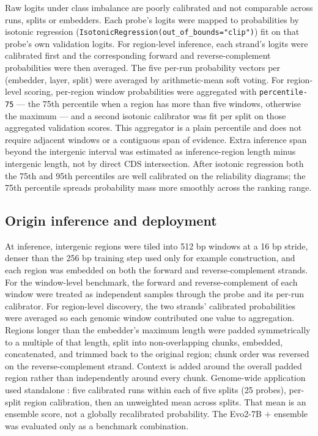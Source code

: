 Raw logits under class imbalance are poorly calibrated and not comparable
across runs, splits or embedders. Each probe's logits were mapped to
probabilities by isotonic regression \cite{zadrozny2002isotonic}
(\texttt{Isotonic\allowbreak Regression(\allowbreak out\_of\_\allowbreak bounds=\allowbreak"clip")})
fit on that probe's own
validation logits. For region-level inference, each strand's logits were
calibrated first and the corresponding forward and reverse-complement
probabilities were then averaged. The five per-run probability vectors per
(embedder, layer, split) were averaged by arithmetic-mean soft voting. For
region-level scoring, per-region window probabilities were aggregated with
\texttt{percentile-75} --- the 75th percentile when a region has more than
five windows, otherwise the maximum --- and a second isotonic calibrator was
fit per split on those aggregated validation scores. This aggregator is a
plain percentile and does not require adjacent windows or a contiguous span
of evidence. Extra inference span beyond the intergenic interval was
estimated as inference-region length minus intergenic length, not by direct
CDS intersection. After isotonic regression both the 75th and 95th
percentiles are well calibrated on the reliability diagrams; the 75th
percentile spreads probability mass more smoothly across the ranking range.

\subsection*{Origin inference and deployment}

At inference, intergenic regions were tiled into 512 bp windows at a 16 bp
stride, denser than the 256 bp training step used only for example
construction, and each region was embedded on both the forward and
reverse-complement strands. For the window-level benchmark, the forward and
reverse-complement of each window were treated as independent samples through
the probe and its per-run calibrator. For region-level discovery, the two
strands' calibrated probabilities were averaged so each genomic window
contributed one value to aggregation. Regions longer than the embedder's
maximum length were padded symmetrically to a multiple of that length, split
into non-overlapping chunks, embedded, concatenated, and trimmed back to the
original region; chunk order was reversed on the reverse-complement strand.
Context is added around the overall padded region rather than independently
around every chunk. Genome-wide application used standalone \model: five
calibrated runs within each of five splits (25 probes), per-split region
calibration, then an unweighted mean across splits. That mean is an ensemble
score, not a globally recalibrated probability. The Evo2-7B $+$ \model
ensemble was evaluated only as a benchmark combination.

